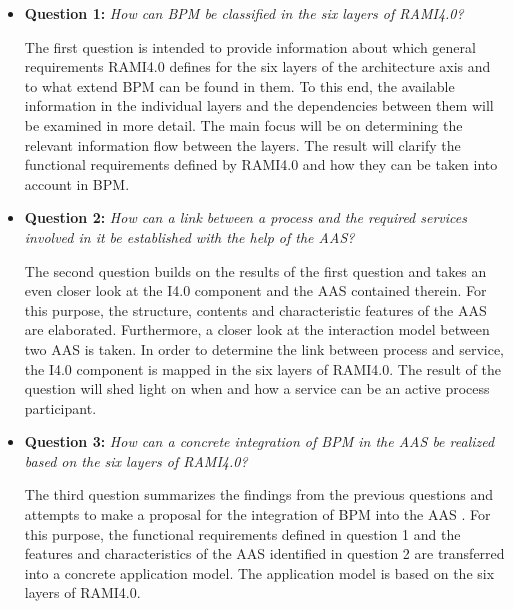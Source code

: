 \begin{itemize}
    \item [] \textbf{Question 1:} \textit{How can \ac{BPM} be classified in the six layers of \ac{RAMI4.0}?}
    
    The first question is intended to provide information about which general requirements \ac{RAMI4.0} defines for the six layers of the architecture axis and to what extend \ac{BPM} can be found in them. To this end, the available information in the individual layers and the dependencies between them will be examined in more detail. The main focus will be on determining the relevant information flow between the layers. The result will clarify the functional requirements defined by \ac{RAMI4.0} and how they can be taken into account in \ac{BPM}.
    
    \item [] \textbf{Question 2:} \textit{How can a link between a process and the required services involved in it be established with the help of the \ac{AAS}?}
    
    The second question builds on the results of the first question and takes an even closer look at the \ac{I4.0} component and the \ac{AAS} contained therein. For this purpose, the structure, contents and characteristic features of the \ac{AAS} are elaborated. Furthermore, a closer look at the interaction model between two \ac{AAS} is taken. In order to determine the link between process and service, the \ac{I4.0} component is mapped in the six layers of \ac{RAMI4.0}. The result of the question will shed light on when and how a service can be an active process participant.
    
    \item[] \textbf{Question 3:} \textit{How can a concrete integration of \ac{BPM} in the \ac{AAS} be realized based on the six layers of \ac{RAMI4.0}?}
    
    The third question summarizes the findings from the previous questions and attempts to make a proposal for the integration of \ac{BPM} into the \ac{AAS} . For this purpose, the functional requirements defined in question 1 and the features and characteristics of the \ac{AAS} identified in question 2 are transferred into a concrete application model. The application model is based on the six layers of \ac{RAMI4.0}. 

\end{itemize}


